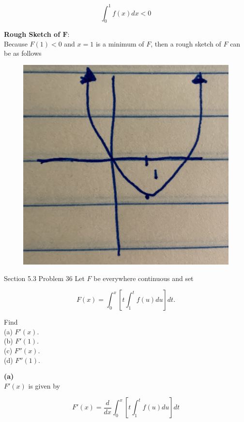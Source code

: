 \documentclass{article}
\begin{document}
    \[
        \int^1_0 f(x)dx < 0
    \]

    \textbf{Rough Sketch of $\bm{F}$}: \\
    Because $F(1)<0$ and $x=1$ is a minimum of $F$, then a rough sketch of $F$ can be as follows
    \begin{figure}[hbt!]
        \centering
        \includegraphics[scale=0.075]{sketch}
    \end{figure}




    \begin{tbhtheorem}{Section 5.3 Problem 36}
        Let $F$ be everywhere continuous and set

        \[
            F(x) = \int^x_0 \left[t\int^t_1 f(u) du \right]dt.
        \]

        Find \\
        (a) $F'(x)$. \\
        (b) $F'(1)$. \\
        (c) $F''(x)$. \\
        (d) $F''(1)$.
    \end{tbhtheorem}

    \textbf{(a)} \\
    $F'(x)$ is given by

    \[
        F'(x) = \frac{d}{dx} \int^x_0 \left[t\int^t_1 f(u)du\right] dt
    \]
\end{document}
